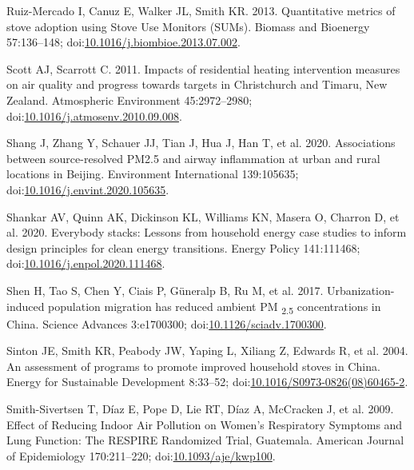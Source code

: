 \documentclass[
  letterpaper,
  DIV=11,
  numbers=noendperiod]{scrartcl}
\newlength{\cslhangindent}
\newlength{\cslentryspacingunit} %
\newenvironment{CSLReferences}[2] %
 {%
  \setlength{\parindent}{0pt}
  \ifodd #1
  \let\oldpar\par
  \def\par{\hangindent=\cslhangindent\oldpar}
  \fi
  \setlength{\parskip}{#2\cslentryspacingunit}
 }%
 {}
\begin{document}
\begin{CSLReferences}{1}{0}
\leavevmode{}%
Ruiz-Mercado I, Canuz E, Walker JL, Smith KR. 2013. Quantitative metrics
of stove adoption using {Stove Use Monitors} ({SUMs}). Biomass and
Bioenergy 57:136--148;
doi:\href{https://doi.org/10.1016/j.biombioe.2013.07.002}{10.1016/j.biombioe.2013.07.002}.

\leavevmode{}%
Scott AJ, Scarrott C. 2011. Impacts of residential heating intervention
measures on air quality and progress towards targets in {Christchurch}
and {Timaru}, {New Zealand}. Atmospheric Environment 45:2972--2980;
doi:\href{https://doi.org/10.1016/j.atmosenv.2010.09.008}{10.1016/j.atmosenv.2010.09.008}.

\leavevmode{}%
Shang J, Zhang Y, Schauer JJ, Tian J, Hua J, Han T, et al. 2020.
Associations between source-resolved {PM2}.5 and airway inflammation at
urban and rural locations in {Beijing}. Environment International
139:105635;
doi:\href{https://doi.org/10.1016/j.envint.2020.105635}{10.1016/j.envint.2020.105635}.

\leavevmode{}%
Shankar AV, Quinn AK, Dickinson KL, Williams KN, Masera O, Charron D, et
al. 2020. Everybody stacks: {Lessons} from household energy case studies
to inform design principles for clean energy transitions. Energy Policy
141:111468;
doi:\href{https://doi.org/10.1016/j.enpol.2020.111468}{10.1016/j.enpol.2020.111468}.

\leavevmode{}%
Shen H, Tao S, Chen Y, Ciais P, Güneralp B, Ru M, et al. 2017.
Urbanization-induced population migration has reduced ambient {PM}
{\textsubscript{2.5}} concentrations in {China}. Science Advances
3:e1700300;
doi:\href{https://doi.org/10.1126/sciadv.1700300}{10.1126/sciadv.1700300}.

\leavevmode{}%
Sinton JE, Smith KR, Peabody JW, Yaping L, Xiliang Z, Edwards R, et al.
2004. An assessment of programs to promote improved household stoves in
{China}. Energy for Sustainable Development 8:33--52;
doi:\href{https://doi.org/10.1016/S0973-0826(08)60465-2}{10.1016/S0973-0826(08)60465-2}.

\leavevmode{}%
Smith-Sivertsen T, Díaz E, Pope D, Lie RT, Díaz A, McCracken J, et al.
2009. Effect of {Reducing Indoor Air Pollution} on {Women}'s
{Respiratory Symptoms} and {Lung Function}: {The RESPIRE Randomized
Trial}, {Guatemala}. American Journal of Epidemiology 170:211--220;
doi:\href{https://doi.org/10.1093/aje/kwp100}{10.1093/aje/kwp100}.


\end{CSLReferences}
\end{document}
